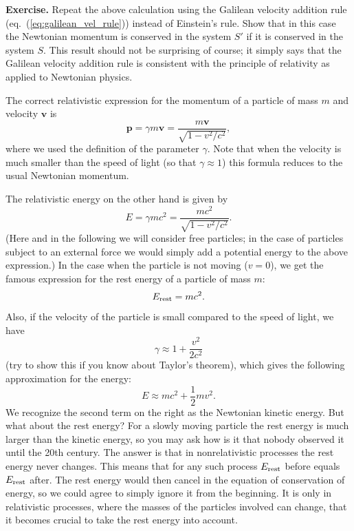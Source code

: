 \documentclass[11pt, a4paper,oneside,openright]{book}
\numberwithin{equation}{section}
\begin{document}
{\bf Exercise.} Repeat the above calculation using the Galilean velocity addition rule (eq.\ (\ref{eq:galilean_vel_rule})) instead of Einstein's rule. Show that in this case the Newtonian momentum is conserved in the system $S'$ if it is conserved in the system $S$. This result should not be surprising of course; it simply says that the Galilean velocity addition rule is consistent with the principle of relativity as applied to Newtonian physics.

\par\vspace{\baselineskip}

The correct relativistic expression for the momentum of a particle of mass $m$ and velocity $\mathbf{v}$ is
\begin{equation} \label{eq:rel_momentum}
\mathbf{p}=\gamma m\mathbf{v}=\frac{m\mathbf{v}}{\sqrt{1-v^2/c^2}},
\end{equation}
where we used the definition of the parameter $\gamma$. Note that when the velocity is much smaller than the speed of light (so that $\gamma\approx1$) this formula reduces to the usual Newtonian momentum.

The relativistic energy on the other hand is given by
\begin{equation} \label{eq:rel_energy}
E=\gamma mc^2=\frac{mc^2}{\sqrt{1-v^2/c^2}}.
\end{equation}
(Here and in the following we will consider free particles; in the case of particles subject to an external force we would simply add a potential energy to the above expression.) In the case when the particle is not moving ($v=0$), we get the famous expression for the rest energy of a particle of mass $m$:
\begin{equation}
E_{\rm rest}=mc^2.
\end{equation}
Also, if the velocity of the particle is small compared to the speed of light, we have
\begin{equation}
\gamma\approx 1+\frac{v^2}{2c^2}
\end{equation}
(try to show this if you know about Taylor's theorem), which gives the following approximation for the energy:
\begin{equation}
E\approx mc^2+\frac{1}{2}mv^2.
\end{equation}
We recognize the second term on the right as the Newtonian kinetic energy. But what about the rest energy? For a slowly moving particle the rest energy is much larger than the kinetic energy, so you may ask how is it that nobody observed it until the 20th century. The answer is that in nonrelativistic processes the rest energy never changes. This means that for any such process $E_{\rm rest}$ before equals $E_{\rm rest}$ after. The rest energy would then cancel in the equation of conservation of energy, so we could agree to simply ignore it from the beginning. It is only in relativistic processes, where the masses of the particles involved can change, that it becomes crucial to take the rest energy into account.
\end{document}

